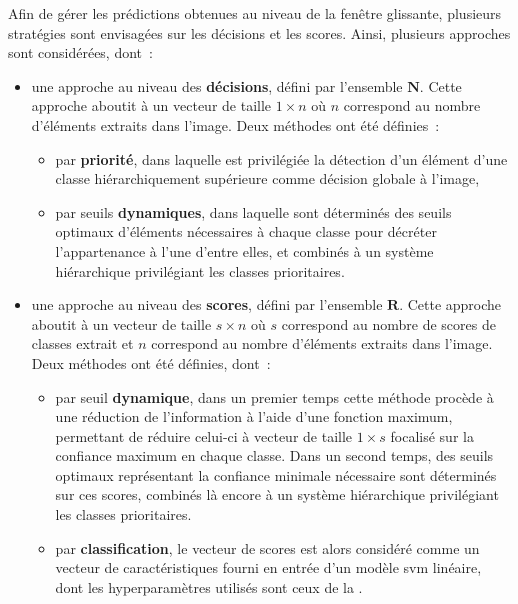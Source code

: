 Afin de gérer les prédictions obtenues au niveau de la fenêtre glissante, plusieurs stratégies sont envisagées sur les décisions et les scores. Ainsi, plusieurs approches sont considérées, dont~:
\begin{itemize}
    \item   une approche au niveau des \textbf{décisions}, défini par l'ensemble $\mathbf{N}$. Cette approche aboutit à un vecteur de taille $1 \times n$ où $n$ correspond au nombre d'éléments extraits dans l'image. Deux méthodes ont été définies~:
            \begin{itemize}
                \item par \textbf{priorité}, dans laquelle est privilégiée la détection d'un élément d'une classe hiérarchiquement supérieure comme décision globale à l'image,
                \item par seuils \textbf{dynamiques}, dans laquelle sont déterminés des seuils optimaux d'éléments nécessaires à chaque classe pour décréter l'appartenance à l'une d'entre elles, et combinés à un système hiérarchique privilégiant les classes prioritaires.
            \end{itemize}
    \item   une approche au niveau des \textbf{scores}, défini par l'ensemble $\mathbf{R}$. Cette approche aboutit à un vecteur de taille $s \times n$ où $s$ correspond au nombre de scores de classes extrait et $n$ correspond au nombre d'éléments extraits dans l'image. Deux méthodes ont été définies, dont~:~
            \begin{itemize}
                \item par seuil \textbf{dynamique}, dans un premier temps cette méthode procède à une réduction de l'information à l'aide d'une fonction maximum, permettant de réduire celui-ci à vecteur de taille $1 \times s$ focalisé sur la confiance maximum en chaque classe. Dans un second temps, des seuils optimaux représentant la confiance minimale nécessaire sont déterminés sur ces scores, combinés là encore à un système hiérarchique privilégiant les classes prioritaires.
                \item par \textbf{classification}, le vecteur de scores est alors considéré comme un vecteur de caractéristiques fourni en entrée d'un modèle \gls{svm} linéaire, dont les hyperparamètres utilisés sont ceux de la .
            \end{itemize}
\end{itemize}\par

